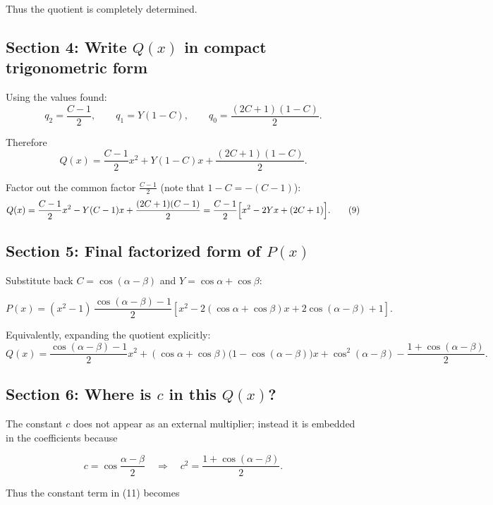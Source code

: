 \documentclass{article}
\begin{document}
Thus the quotient is completely determined.

\subsection*{Section 4: Write \(Q(x)\) in compact trigonometric form}

Using the values found:
\[
q_{2}=\frac{C-1}{2},
\qquad
q_{1}=Y(1-C),
\qquad
q_{0}=\frac{(2C+1)(1-C)}{2}.
\]

Therefore
\[
Q(x)
=
\frac{C-1}{2}x^{2}
+
Y(1-C)x
+
\frac{(2C+1)(1-C)}{2}.
\]

Factor out the common factor \(\displaystyle \frac{C-1}{2}\) (note that \(1-C=-(C-1)\)):
\begin{equation}
Q(x)
=
\frac{C-1}{2}x^{2}
-Y(C-1)x
+\frac{(2C+1)(C-1)}{2}
=
\frac{C-1}{2}
\Bigl[x^{2}-2Yx+(2C+1)\Bigr].
\tag{9}
\end{equation}

\subsection*{Section 5: Final factorized form of \(P(x)\)}

Substitute back \(C=\cos(\alpha-\beta)\) and \(Y=\cos\alpha+\cos\beta\):

\begin{equation}
\boxed{
P(x)=(x^{2}-1)\,
\frac{\cos(\alpha-\beta)-1}{2}
\left[
x^{2}-2(\cos\alpha+\cos\beta)x
+2\cos(\alpha-\beta)+1
\right].
}
\tag{10}
\end{equation}

Equivalently, expanding the quotient explicitly:
\begin{equation}
\boxed{
Q(x)=
\frac{\cos(\alpha-\beta)-1}{2}x^{2}
+(\cos\alpha+\cos\beta)\bigl(1-\cos(\alpha-\beta)\bigr)x
+\cos^{2}(\alpha-\beta)-\frac{1+\cos(\alpha-\beta)}{2}.
}
\tag{11}
\end{equation}

\subsection*{Section 6: Where is \(c\) in this \(Q(x)\)?}

The constant \(c\) does not appear as an external multiplier; instead it is embedded in the coefficients because

\[
c=\cos\frac{\alpha-\beta}{2}
\quad\Longrightarrow\quad
c^{2}=\frac{1+\cos(\alpha-\beta)}{2}.
\]

Thus the constant term in (11) becomes
\end{document}
